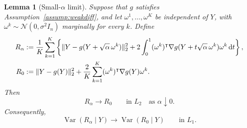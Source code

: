 \documentclass[12pt]{article}
\newtheorem{lemma}{Lemma}[section]
\def\calN{\mathcal{N}}
\newcommand{\tran}{^\intercal}
\newcommand{\rd}{{\mathrm{d}}}
\theoremstyle{general}
\begin{document}
\begin{lemma}[Small-$\alpha$ limit]
\label{lem:smooth-small-noise-limit}
Suppose that $g$ satisfies Assumption~\ref{assump:weakdiff}, and let
$\omega^1,\ldots,\omega^K$ be independent of $Y$, with
$\omega^k\sim\calN(0,\sigma^2I_n)$ marginally for every $k$. Define
\begin{align}
R_\alpha
&:=
\frac1K\sum_{k=1}^K
\left\{
\|Y-g(Y+\sqrt\alpha\,\omega^k)\|_2^2
+
2\int_0^1
(\omega^k)\tran
\nabla g(Y+t\sqrt\alpha\,\omega^k)
\omega^k\,\rd t
\right\},\label{equ:def:R_alpha} \\ 
R_0
&:=
\|Y-g(Y)\|_2^2
+
\frac2K\sum_{k=1}^K
(\omega^k)\tran\nabla g(Y)\omega^k.\notag
\end{align}
Then
\[
R_\alpha\longrightarrow R_0
\qquad\text{in }L_2
\quad\text{as }\alpha\downarrow0.
\]
Consequently,
\[
\operatorname{Var}(R_\alpha\mid Y)
\longrightarrow
\operatorname{Var}(R_0\mid Y)
\qquad\text{in }L_1.
\]
\end{lemma}
\end{document}
